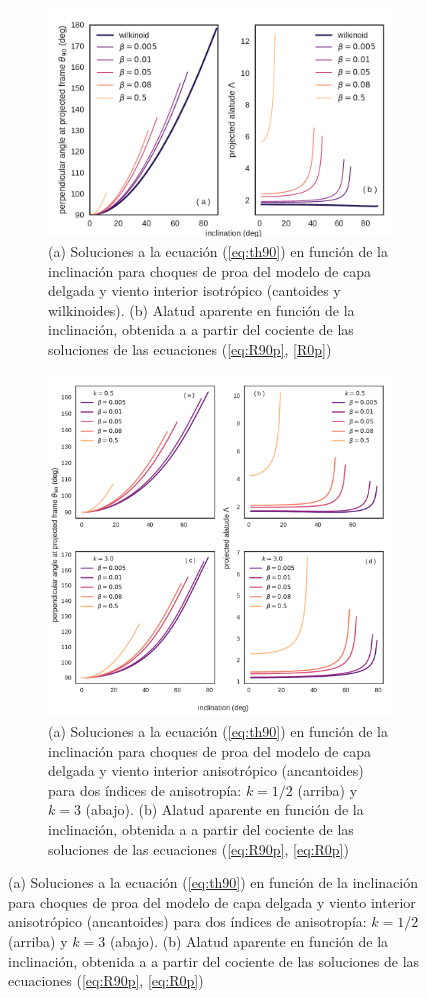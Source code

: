 \begin{figure}
\begin{figure}
  \includegraphics[width=\linewidth]{./Figures/cantoid-th90-vs-i}
  \caption{(a) Soluciones a la ecuación (\ref{eq:th90}) en función de la inclinación para choques de proa del modelo de capa delgada y viento interior isotrópico (cantoides y wilkinoides). (b) Alatud aparente en función de la inclinación, obtenida a a partir del cociente de las soluciones de las ecuaciones (\ref{eq:R90p}, \ref{R0p})}
  \label{fig:t90-isotropic}
\end{figure}

\begin{figure}
  \includegraphics[width=\linewidth]{./Figures/ancantoid-th90-vs-i}
  \caption{(a) Soluciones a la ecuación (\ref{eq:th90}) en función de la inclinación para choques de proa del modelo de capa delgada y viento interior anisotrópico (ancantoides) para dos índices de anisotropía: $k=1/2$ (arriba) y $k=3$ (abajo). (b) Alatud aparente en función de la inclinación, obtenida a a partir del cociente de las soluciones de las ecuaciones (\ref{eq:R90p}, \ref{eq:R0p})}
  \label{fig:t90-anisotropic}
\end{figure}


\end{figure}
